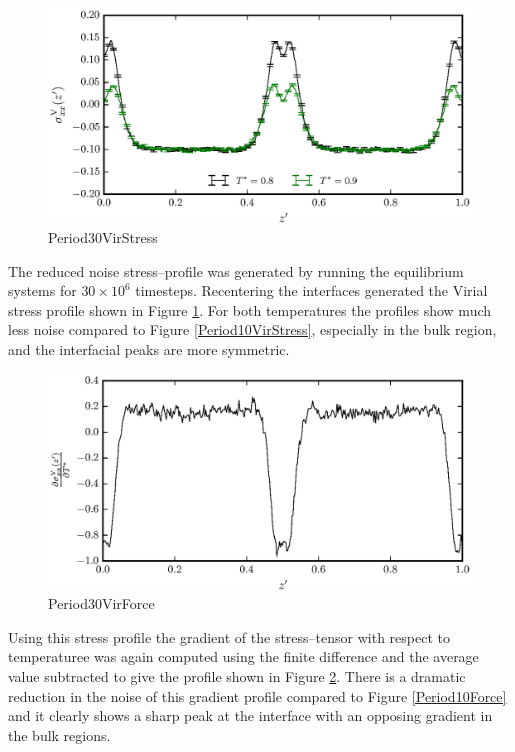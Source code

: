 \begin{figure}[h]
\centering
\includegraphics[scale=0.8]{Period30VirStress}
\caption{Period30VirStress}
\label{Period30VirStress}
\end{figure}

The reduced noise stress--profile was generated by running the equilibrium systems for $30 \times 10^{6}$ timesteps.
Recentering the interfaces generated the Virial stress profile shown in Figure \ref{Period30VirStress}.
For both temperatures the profiles show much less noise compared to Figure \ref{Period10VirStress}, especially in the bulk region, and the interfacial peaks are more symmetric.
\FloatBarrier

\begin{figure}[h]
\centering
\includegraphics[scale=0.8]{Period30VirForce}
\caption{Period30VirForce}
\label{Period30VirForce}
\end{figure}
Using this stress profile the gradient of the stress--tensor with respect to temperaturee was again computed using the finite difference and the average value subtracted to give the profile shown in Figure \ref{Period30VirForce}.
There is a dramatic reduction in the noise of this gradient profile compared to Figure \ref{Period10Force} and it clearly shows a sharp peak at the interface with an opposing gradient in the bulk regions.
\FloatBarrier

